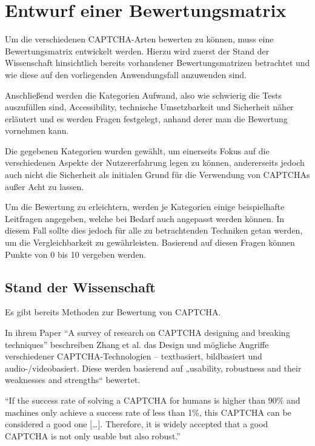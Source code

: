 \chapter{Entwurf einer Bewertungsmatrix}
\label{ch:matrix}

Um die verschiedenen CAPTCHA-Arten bewerten zu können, muss eine Bewertungsmatrix entwickelt werden. 
Hierzu wird zuerst der Stand der Wissenschaft hinsichtlich bereits vorhandener Bewertungsmatrizen betrachtet 
und wie diese auf den vorliegenden Anwendungsfall anzuwenden sind. 

Anschließend werden die Kategorien Aufwand, also wie schwierig die Tests auszufüllen sind, Accessibility, technische Umsetzbarkeit 
und Sicherheit näher erläutert und es werden Fragen festgelegt, anhand derer man die Bewertung vornehmen kann.

Die gegebenen Kategorien wurden gewählt, um einerseits Fokus auf die verschiedenen Aspekte der Nutzererfahrung legen zu können,
andererseits jedoch auch nicht die Sicherheit als initialen Grund für die Verwendung von CAPTCHAs außer Acht zu lassen.

Um die Bewertung zu erleichtern, werden je Kategorien einige beispielhafte Leitfragen angegeben, welche bei Bedarf auch angepasst werden können.
In diesem Fall sollte dies jedoch für alle zu betrachtenden Techniken getan werden, um die Vergleichbarkeit zu gewährleisten.
Basierend auf diesen Fragen können Punkte von 0 bis 10 vergeben werden. 

\section{Stand der Wissenschaft}
\label{ch:matrix:sdw}

Es gibt bereits Methoden zur Bewertung von CAPTCHA.

In ihrem Paper ``A survey of research on CAPTCHA designing and breaking techniques'' beschreiben Zhang et al. das Design 
und mögliche Angriffe verschiedener CAPTCHA-Technologien – textbasiert, bildbasiert und audio-/videobasiert. 
Diese werden basierend auf „usability, robustness and their weaknesses and strengths“ bewertet.  \cite[p.75]{surveyofresearch}  

``If the success rate of solving a CAPTCHA for humans is higher than 90\% and machines only achieve 
a success rate of less than 1\%, this CAPTCHA can be considered a good one $[$\dots$]$. 
Therefore, it is widely accepted that a good CAPTCHA is not only usable but also robust.'' \cite[p.75]{surveyofresearch}

